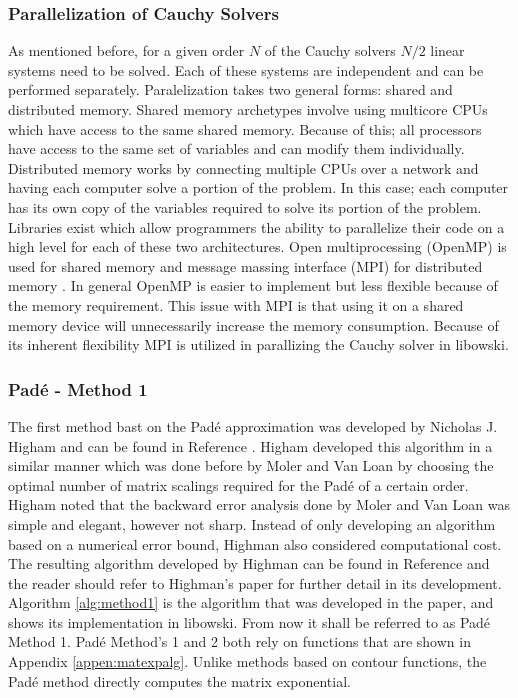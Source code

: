 \subsubsection{Parallelization of Cauchy Solvers}
As mentioned before, for a given order $N$ of the Cauchy solvers $N/2$ linear systems need to be solved. Each of these systems are independent and can be performed separately. Paralelization takes two general forms: shared and distributed memory. Shared memory archetypes involve using multicore CPUs which have access to the same shared memory. Because of this; all processors have access to the same set of variables and can modify them individually. Distributed memory works by connecting multiple CPUs over a network and having each computer solve a portion of the problem. In this case; each computer has its own copy of the variables required to solve its portion of the problem. Libraries exist which allow programmers the ability to parallelize their code on a high level for each of these two architectures. Open multiprocessing (OpenMP) is used for shared memory and message massing interface (MPI) for distributed memory \cite{openmp} \cite{mpi}. In general OpenMP is easier to implement but less flexible because of the memory requirement. This issue with MPI is that using it on a shared memory device will unnecessarily increase the memory consumption. Because of its inherent flexibility MPI is utilized in parallizing the Cauchy solver in libowski. 

\subsubsection{Pad\'e - Method 1}
The first method bast on the Pad\'e approximation was developed by Nicholas J. Higham and can be found in Reference \cite{higham2005}. Higham developed this algorithm in a similar manner which was done before by Moler and Van Loan \cite{moler2003} by choosing the optimal number of matrix scalings required for the Pad\'e of a certain order. Higham noted that the backward error analysis done by Moler and Van Loan was simple and elegant, however not sharp. Instead of only developing an algorithm based on a numerical error bound, Highman also considered computational cost. The resulting algorithm developed by Highman can be found in Reference \cite{higham2005} and the reader should refer to Highman's paper for further detail in its development. Algorithm \ref{alg:method1} is the algorithm that was developed in the paper, and shows its implementation in libowski. From now it shall be referred to as Pad\'e Method 1. Pad\'e Method's 1 and 2 both rely on functions that are shown in Appendix \ref{appen:matexpalg}. Unlike methods based on contour functions, the Pad\'e method directly computes the matrix exponential. 

